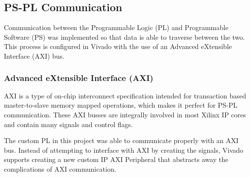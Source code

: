 \subsection{PS-PL Communication} \label{ssec:ps_pl}
Communication between the Programmable Logic (PL) and Programmable Software (PS) was implemented so that data is able to traverse between the two. This process is configured in Vivado with the use of an Advanced eXtensible Interface (AXI) bus.

\subsubsection{Advanced eXtensible Interface (AXI)}
AXI is a type of on-chip interconnect specification intended for transaction based master-to-slave memory mapped operations, which makes it perfect for PS-PL communication. These AXI busses are integrally involved in most Xilinx IP cores and contain many signals and control flags.
\par
The custom PL in this project was able to communicate properly with an AXI bus. Instead of attempting to interface with AXI by creating the signals, Vivado supports creating a new custom IP AXI Peripheral that abstracts away the complications of AXI communication.


